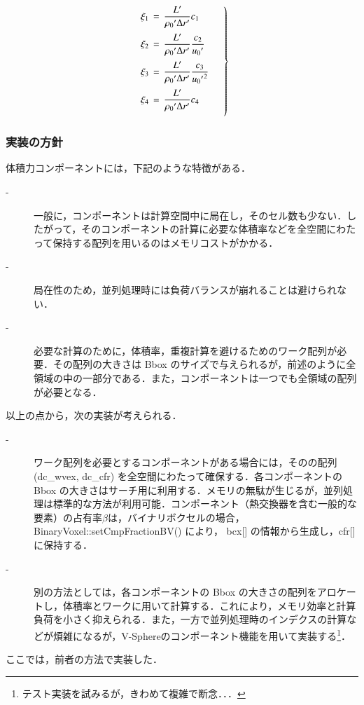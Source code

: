 \begin{equation}
\left.{
\begin{array}{l}
\vspace{2mm}
\displaystyle{ \xi_{1} \,=\, \frac{ L^{\prime}} { {\rho_{0}}^{\prime} \Delta r^{\prime}} c_{1} }\\
\vspace{2mm}
\displaystyle{ \xi_{2} \,=\, \frac{ L^{\prime}} { {\rho_{0}}^{\prime} \Delta r^{\prime}} \frac{c_{2}}{{u_{0}}^{\prime}} }\\
\vspace{2mm}
\displaystyle{ \xi_{3} \,=\, \frac{ L^{\prime}} { {\rho_{0}}^{\prime} \Delta r^{\prime}} \frac{c_{3}}{{{u_{0}}^{\prime}}^{2}} }\\
\vspace{2mm}
\displaystyle{ \xi_{4} \,=\, \frac{ L^{\prime}} { {\rho_{0}}^{\prime} \Delta r^{\prime}} c_{4} }
\end{array} \quad }\right\}
\label{eq:coef14_pl}
\end{equation}

\subsubsection{実装の方針}
体積力コンポーネントには，下記のような特徴がある．
\begin{description}
\item[-] 一般に，コンポーネントは計算空間中に局在し，そのセル数も少ない．したがって，そのコンポーネントの計算に必要な体積率などを全空間にわたって保持する配列を用いるのはメモリコストがかかる．
\item[-] 局在性のため，並列処理時には負荷バランスが崩れることは避けられない．
\item[-] 必要な計算のために，体積率，重複計算を避けるためのワーク配列が必要．その配列の大きさは Bbox のサイズで与えられるが，前述のように全領域の中の一部分である．また，コンポーネントは一つでも全領域の配列が必要となる．
\end{description}

以上の点から，次の実装が考えられる．
\begin{description}
\item[-] ワーク配列を必要とするコンポーネントがある場合には，そのの配列 (dc\_wvex, dc\_cfr) を全空間にわたって確保する．各コンポーネントの Bbox の大きさはサーチ用に利用する．メモリの無駄が生じるが，並列処理は標準的な方法が利用可能．コンポーネント（熱交換器を含む一般的な要素）の占有率$\beta$は，バイナリボクセルの場合，BinaryVoxel::setCmpFractionBV() により， bcx[] の情報から生成し，cfr[] に保持する．
\item[-] 別の方法としては，各コンポーネントの Bbox の大きさの配列をアロケートし，体積率とワークに用いて計算する．これにより，メモリ効率と計算負荷を小さく抑えられる．また，一方で並列処理時のインデクスの計算などが煩雑になるが，V-Sphereのコンポーネント機能を用いて実装する\footnote{テスト実装を試みるが，きわめて複雑で断念．．．}．
\end{description}
ここでは，前者の方法で実装した．

